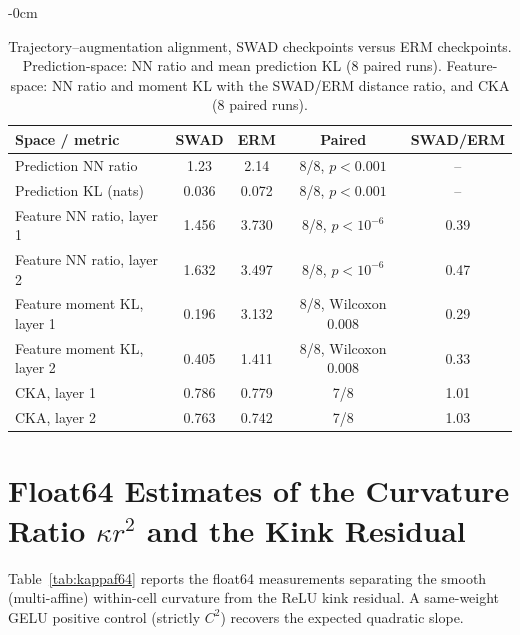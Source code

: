 \documentclass[electronics,article,submit,moreauthors]{Definitions/mdpi}
\begin{document}
\begin{adjustwidth}{-\extralength}{0cm}
\begin{table}[H]
\centering
\caption{Trajectory--augmentation alignment, SWAD checkpoints versus ERM checkpoints. Prediction-space: NN ratio and mean prediction KL (8 paired runs). Feature-space: NN ratio and moment KL with the SWAD/ERM distance ratio, and CKA (8 paired runs).}
\label{tab:align}
\setlength{\tabcolsep}{4.5pt}
\footnotesize
\begin{tabular}{lcccc}
\toprule
\textbf{Space / metric} & \textbf{SWAD} & \textbf{ERM} & \textbf{Paired} & \textbf{SWAD/ERM}\\
\midrule
Prediction NN ratio & 1.23 & 2.14 & 8/8, $p<0.001$ & --\\
Prediction KL (nats) & 0.036 & 0.072 & 8/8, $p<0.001$ & --\\
\midrule
Feature NN ratio, layer 1 & 1.456 & 3.730 & 8/8, $p<10^{-6}$ & 0.39\\
Feature NN ratio, layer 2 & 1.632 & 3.497 & 8/8, $p<10^{-6}$ & 0.47\\
Feature moment KL, layer 1 & 0.196 & 3.132 & 8/8, Wilcoxon 0.008 & 0.29\\
Feature moment KL, layer 2 & 0.405 & 1.411 & 8/8, Wilcoxon 0.008 & 0.33\\
CKA, layer 1 & 0.786 & 0.779 & 7/8 & 1.01\\
CKA, layer 2 & 0.763 & 0.742 & 7/8 & 1.03\\
\bottomrule
\end{tabular}
\end{table}

\section{Float64 Estimates of the Curvature Ratio $\kappa r^2$ and the Kink Residual}
\label{sec:appkappa}

Table~\ref{tab:kappaf64} reports the float64 measurements separating the smooth (multi-affine) within-cell curvature from the ReLU kink residual. A same-weight GELU positive control (strictly $C^2$) recovers the expected quadratic slope.


\end{adjustwidth}
\end{document}
